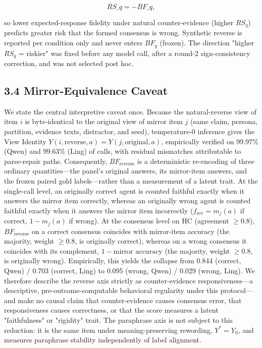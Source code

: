 \documentclass[11pt]{article}
\begin{document}
$$RS\_q = -BF\_q,$$

so lower expected-response fidelity under natural counter-evidence (higher $RS_q$) predicts greater risk that the formed consensus is wrong. Synthetic reverse is reported per condition only and never enters $BF_q$ (frozen). The direction "higher $RS_q$ = riskier" was fixed before any model call, after a round-2 sign-consistency correction, and was not selected post hoc.

\subsection{3.4 Mirror-Equivalence Caveat}

We state the central interpretive caveat once. Because the natural-reverse view of item $i$ is byte-identical to the original view of mirror item $j$ (same claim, persona, partition, evidence texts, distractor, and seed), temperature-0 inference gives the View Identity $Y(i,\mathrm{reverse},a) = Y(j,\mathrm{original},a)$, empirically verified on 99.97\% (Qwen) and 99.63\% (Ling) of calls, with residual mismatches attributable to parse-repair paths. Consequently, $BF_{\mathrm{reverse}}$ is a deterministic re-encoding of three ordinary quantities—the panel's original answers, its mirror-item answers, and the frozen paired gold labels—rather than a measurement of a latent trait. At the single-call level, an originally correct agent is counted faithful exactly when it answers the mirror item correctly, whereas an originally wrong agent is counted faithful exactly when it answers the mirror item incorrectly ($f_{\mathrm{rev}} = m_j(a)$ if correct, $1 - m_j(a)$ if wrong). At the consensus level on HC (agreement $\geq 0.8$), $BF_{\mathrm{reverse}}$ on a correct consensus coincides with mirror-item accuracy (the majority, weight $\geq 0.8$, is originally correct), whereas on a wrong consensus it coincides with its complement, $1 - \text{mirror accuracy}$ (the majority, weight $\geq 0.8$, is originally wrong). Empirically, this yields the collapse from 0.844 (correct, Qwen) / 0.703 (correct, Ling) to 0.095 (wrong, Qwen) / 0.029 (wrong, Ling). We therefore describe the reverse axis strictly as counter-evidence responsiveness—a descriptive, pre-outcome-computable behavioral regularity under this protocol—and make no causal claim that counter-evidence causes consensus error, that responsiveness causes correctness, or that the score measures a latent "faithfulness" or "rigidity" trait. The paraphrase axis is not subject to this reduction: it is the same item under meaning-preserving rewording, $Y^* = Y_0$, and measures paraphrase stability independently of label alignment.
\end{document}
